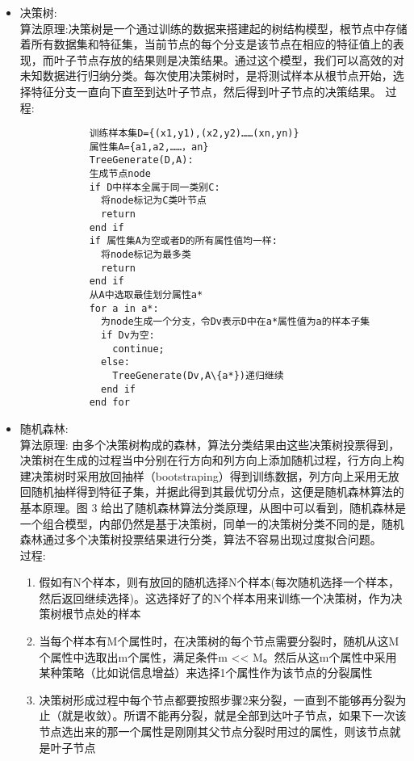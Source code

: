 \documentclass{hitreport}
\begin{document}
\begin{itemize}
\begin{itemize}
          \item 决策树:\\
                算法原理:决策树是一个通过训练的数据来搭建起的树结构模型，根节点中存储着所有数据集和特征集，当前节点的每个分支是该节点在相应的特征值上的表现，而叶子节点存放的结果则是决策结果。通过这个模型，我们可以高效的对未知数据进行归纳分类。每次使用决策树时，是将测试样本从根节点开始，选择特征分支一直向下直至到达叶子节点，然后得到叶子节点的决策结果。
                过程:
                \begin{lstlisting}
            训练样本集D={(x1,y1),(x2,y2)……(xn,yn)}
            属性集A={a1,a2,……，an}
            TreeGenerate(D,A): 
            生成节点node
            if D中样本全属于同一类别C:
              将node标记为C类叶节点
              return
            end if
            if 属性集A为空或者D的所有属性值均一样:
              将node标记为最多类
              return
            end if
            从A中选取最佳划分属性a*
            for a in a*:
              为node生成一个分支，令Dv表示D中在a*属性值为a的样本子集
              if Dv为空:
                continue;
              else:
                TreeGenerate(Dv,A\{a*})递归继续
              end if
            end for
          \end{lstlisting}
          \item 随机森林:\\
                算法原理:
                由多个决策树构成的森林，算法分类结果由这些决策树投票得到，决策树在生成的过程当中分别在行方向和列方向上添加随机过程，行方向上构建决策树时采用放回抽样（bootstraping）得到训练数据，列方向上采用无放回随机抽样得到特征子集，并据此得到其最优切分点，这便是随机森林算法的基本原理。图 3 给出了随机森林算法分类原理，从图中可以看到，随机森林是一个组合模型，内部仍然是基于决策树，同单一的决策树分类不同的是，随机森林通过多个决策树投票结果进行分类，算法不容易出现过度拟合问题。\\
                过程:
                \begin{enumerate}
                  \item 假如有N个样本，则有放回的随机选择N个样本(每次随机选择一个样本，然后返回继续选择)。这选择好了的N个样本用来训练一个决策树，作为决策树根节点处的样本
                  \item 当每个样本有M个属性时，在决策树的每个节点需要分裂时，随机从这M个属性中选取出m个属性，满足条件m << M。然后从这m个属性中采用某种策略（比如说信息增益）来选择1个属性作为该节点的分裂属性
                  \item 决策树形成过程中每个节点都要按照步骤2来分裂，一直到不能够再分裂为止（就是收敛）。所谓不能再分裂，就是全部到达叶子节点，如果下一次该节点选出来的那一个属性是刚刚其父节点分裂时用过的属性，则该节点就是叶子节点

\end{enumerate}
\end{itemize}
\end{itemize}
\end{document}
